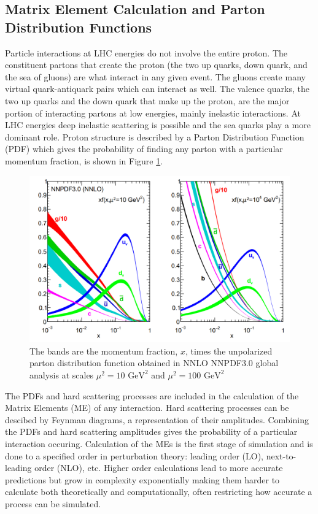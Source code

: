 \subsection{ Matrix Element Calculation and Parton Distribution Functions}

Particle interactions at LHC energies do not involve the entire proton.  The constituent partons that create the proton (the two up quarks, down quark, and the sea of gluons) are what interact in any given event.  The gluons create many virtual quark-antiquark pairs which can interact as well.  The valence quarks, the two up quarks and the down quark that make up the proton, are the major portion of interacting partons at low energies, mainly inelastic interactions.  At LHC energies deep inelastic scattering is possible and the sea quarks play a more dominant role.  Proton structure is described by a Parton Distribution Function (PDF) which gives the probability of finding any parton with a particular momentum fraction, is shown in Figure \ref{fig:PDF}.

\begin{figure}[h!]
	\centering
	\includegraphics[width=\columnwidth]{../ThesisImages/Simulation/PDF.png}
	\caption[The bands are the momentum fraction, $x$, times the unpolarized parton distribution function obtained in NNLO NNPDF3.0 global analysis at scales $\mu^2= 10$ GeV and $\mu^2 = 100 \text{ GeV}^2$]{The bands are the momentum fraction, $x$, times the unpolarized parton distribution function obtained in NNLO NNPDF3.0 global analysis at scales $\mu^2= 10 \text{ GeV}^2$ and $\mu^2 = 100 \text{ GeV}^2$ \cite{PDG2018} 
	}
	\label{fig:PDF}
\end{figure}
The PDFs and hard scattering processes are included in the calculation of the Matrix Elements (ME) of any interaction.  Hard scattering processes can be descibed by Feynman diagrams, a representation of their amplitudes.  Combining the PDFs and hard scattering amplitudes gives the probability of a particular interaction occuring.  Calculation of the MEs is the first stage of simulation and is done to a specified order in perturbation theory: leading order (LO), next-to-leading order (NLO), etc.  Higher order calculations lead to more accurate predictions but grow in complexity exponentially making them harder to calculate both theoretically and computationally, often restricting how accurate a process can be simulated.  

